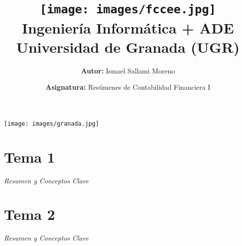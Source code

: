 \documentclass[a4paper,12pt]{article}
\title{
    \vspace{-2cm}
    \texttt{[image: images/fccee.jpg]} \\ %
    \LARGE Ingeniería Informática + ADE\\
    \large Universidad de Granada (UGR)\\[1cm]
}
\author{\textbf{Autor:} Ismael Sallami Moreno}
\date{\textbf{Asignatura:} Resúmenes de Contabilidad Financiera I}
\begin{document}
\maketitle
\thispagestyle{empty}

\begin{center}
    \texttt{[image: images/granada.jpg]} \\ %
    \vfill
\end{center}

\newpage

\tableofcontents
\newpage

\section{Tema 1}
\begin{center}
    \vspace*{2cm}
    \vspace*{1cm}
    \Large\textit{Resumen y Conceptos Clave}
    \vspace*{2cm}
\end{center}
\newpage


\section{Tema 2}
\begin{center}
    \vspace*{2cm}
    \vspace*{1cm}
    \Large\textit{Resumen y Conceptos Clave}
    \vspace*{2cm}
\end{center}
\newpage


% 
\end{document}
